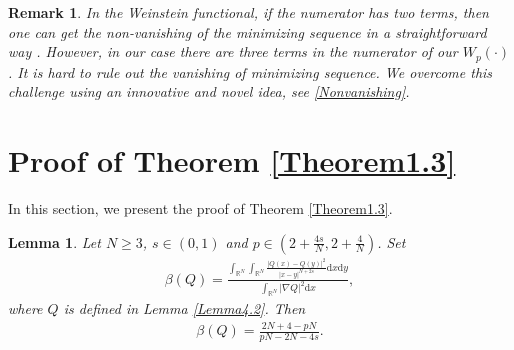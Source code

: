 \documentclass[12pt,a4paper,reqno]{amsart}
\numberwithin{equation}{section}
\newtheorem{lemma}{Lemma}[section]
\newtheorem{remark}{Remark}[section]
\begin{document}
\begin{remark}
In the Weinstein functional,
if the numerator has two terms,
then one can get the non-vanishing of the minimizing sequence in a straightforward way \cite{Weinstein1983CMP}.
However,
in our case there are three terms in the numerator of our $W_{p}(\cdot)$.
It is hard to rule out the vanishing of minimizing sequence.
We overcome this challenge using an innovative and novel idea,
see \eqref{Nonvanishing}.
\end{remark}






\section{Proof of Theorem \ref{Theorem1.3}}
In this section,
we present the proof of Theorem \ref{Theorem1.3}.
\begin{lemma}\label{Lemma5.1}
Let $N\geqslant 3$, $s\in(0,1)$ and $p \in(2+\frac{4s}{N},2+\frac{4}{N})$.
Set
\begin{equation*}
\begin{aligned}
\beta(Q)=\frac{\int_{\mathbb{R}^{N}}\int_{\mathbb{R}^{N}}\frac{|Q(x)-Q(y)|^{2}}{|x-y|^{N+2s}}\mathrm{d}x\mathrm{d}y}
{\int_{\mathbb{R}^{N}}|\nabla Q|^{2}\mathrm{d}x},
\end{aligned}
\end{equation*}
where $Q$ is defined in Lemma \ref{Lemma4.2}.
Then
\begin{equation*}
\begin{aligned}
\beta(Q)=\frac{2N+4-pN}{pN-2N-4s}.
\end{aligned}
\end{equation*}
\end{lemma}
\end{document}
